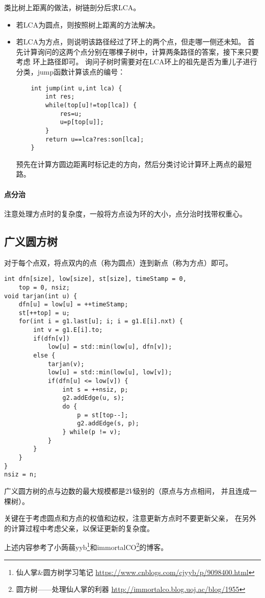 类比树上距离的做法，树链剖分后求LCA。
\begin{itemize}
    \item 若LCA为圆点，则按照树上距离的方法解决。
    \item 若LCA为方点，则说明该路径经过了环上的两个点，但走哪一侧还未知。
    首先计算询问的这两个点分别在哪棵子树中，计算两条路径的答案，接下来只要考虑
    环上路径即可。
    询问子树时需要对在LCA环上的祖先是否为重儿子进行分类，jump函数计算该点的编号：
    \begin{lstlisting}
    int jump(int u,int lca) {
        int res;
        while(top[u]!=top[lca]) {
            res=u;
            u=p[top[u]];
        }
        return u==lca?res:son[lca];
    }
    \end{lstlisting}
    预先在计算方圆边距离时标记走的方向，然后分类讨论计算环上两点的最短路。
\end{itemize}
\paragraph{点分治}
注意处理方点时的复杂度，一般将方点设为环的大小，点分治时找带权重心。
\subsection{广义圆方树}
对于每个点双，将点双内的点（称为圆点）连到新点（称为方点）即可。
\begin{lstlisting}
int dfn[size], low[size], st[size], timeStamp = 0,
    top = 0, nsiz;
void tarjan(int u) {
    dfn[u] = low[u] = ++timeStamp;
    st[++top] = u;
    for(int i = g1.last[u]; i; i = g1.E[i].nxt) {
        int v = g1.E[i].to;
        if(dfn[v])
            low[u] = std::min(low[u], dfn[v]);
        else {
            tarjan(v);
            low[u] = std::min(low[u], low[v]);
            if(dfn[u] <= low[v]) {
                int s = ++nsiz, p;
                g2.addEdge(u, s);
                do {
                    p = st[top--];
                    g2.addEdge(s, p);
                } while(p != v);
            }
        }
    }
}
nsiz = n;
\end{lstlisting}
广义圆方树的点与边数的最大规模都是$2V$级别的（原点与方点相间，
并且连成一棵树）。

关键在于考虑圆点和方点的权值和边权，注意更新方点时不要更新父亲，
在另外的计算过程中考虑父亲，以保证更新的复杂度。

上述内容参考了小蒟蒻yyb\footnote{仙人掌\&圆方树学习笔记
    \url{https://www.cnblogs.com/cjyyb/p/9098400.html}
}和immortalCO\footnote{圆方树——处理仙人掌的利器
    \url{http://immortalco.blog.uoj.ac/blog/1955}
}的博客。
